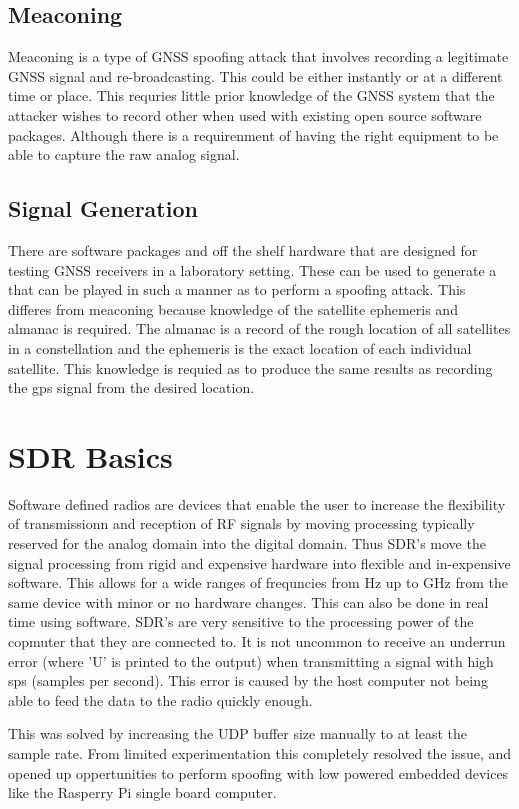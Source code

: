 \subsection{Meaconing}
Meaconing is a type of GNSS spoofing attack that involves recording a legitimate GNSS signal and re-broadcasting. This could be either instantly or at a different time or
place. This requries little prior knowledge of the GNSS system that the attacker wishes to record other when used with existing open source software packages. Although
there is a requirenment of having the right equipment to be able to capture the raw analog signal.

\subsection{Signal Generation}
There are software packages and off the shelf hardware that are designed for testing GNSS receivers in a laboratory setting. These can be used to generate a that can be
played in such a manner as to perform a spoofing attack. This differes from meaconing because knowledge of the satellite ephemeris and almanac is required. The almanac is
a record of the rough location of all satellites in a constellation and the ephemeris is the exact location of each individual satellite. This knowledge is requied as to
produce the same results as recording the gps signal from the desired location.


\section{SDR Basics}
Software defined radios are devices that enable the user to increase the flexibility of transmissionn and reception of RF signals by moving processing typically reserved
for the analog domain into the digital domain. Thus SDR's move the signal processing from rigid and expensive hardware into flexible and in-expensive software. This
allows for a wide ranges of frequncies from Hz up to GHz from the same device with minor or no hardware changes. This can also be done in real time using software.
SDR's are very sensitive to the processing power of the copmuter that they are connected to. It is not uncommon to receive an underrun error (where 'U' is printed to the
output) when transmitting a signal with high sps (samples per second). This error is caused by the host computer not being able to feed the data to the radio quickly
enough.

This was solved by increasing the UDP buffer size manually to at least the sample rate. From limited experimentation this completely resolved the issue, and opened up
oppertunities to perform spoofing with low powered embedded devices like the Rasperry Pi single board computer. 